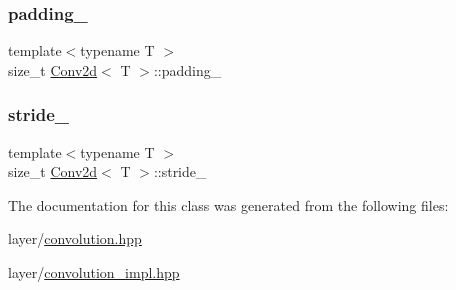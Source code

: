 \mbox{\label{class_conv2d_a8e548b8a5c0efaf494b819523951b558}} 
\subsubsection{\texorpdfstring{padding\_}{padding\_}}
{\footnotesize\ttfamily template$<$typename T $>$ \\
size\+\_\+t \mbox{\hyperlink{class_conv2d}{Conv2d}}$<$ T $>$\+::padding\+\_\+\hspace{0.3cm}{\ttfamily [protected]}}

\mbox{\label{class_conv2d_a95a69ad326bc6279247163d50f332b3d}} 
\subsubsection{\texorpdfstring{stride\_}{stride\_}}
{\footnotesize\ttfamily template$<$typename T $>$ \\
size\+\_\+t \mbox{\hyperlink{class_conv2d}{Conv2d}}$<$ T $>$\+::stride\+\_\+\hspace{0.3cm}{\ttfamily [protected]}}



The documentation for this class was generated from the following files\+:\begin{DoxyCompactItemize}
\item 
layer/\mbox{\hyperlink{convolution_8hpp}{convolution.\+hpp}}\item 
layer/\mbox{\hyperlink{convolution__impl_8hpp}{convolution\+\_\+impl.\+hpp}}\end{DoxyCompactItemize}
